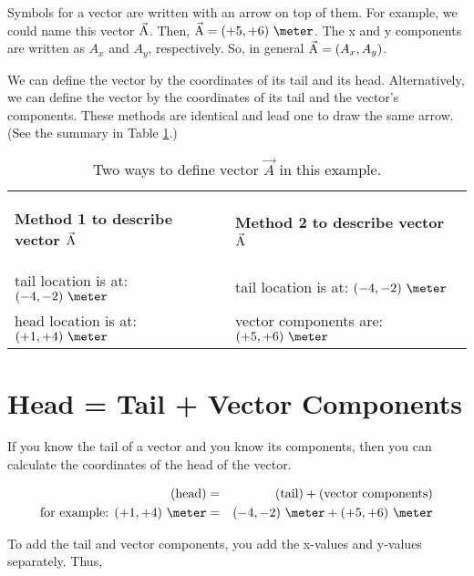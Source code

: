 Symbols for a vector are written with an arrow on top of them. For example, we could name this vector $\vec{\mathrm{A}}$. Then, $\vect{A}=(+5,+6)\ \meter$. The x and y components are written as $A_x$ and $A_y$, respectively. So, in general  $\vec{\mathrm{A}}=(A_x,A_y)$.

We can define the vector by the coordinates of its tail and its head. Alternatively, we can define the vector by the coordinates of its tail and the vector's components. These methods are identical and lead one to draw the same arrow. (See the summary in Table \ref{vectors/definition}.)

\begin{table}[htdp]
\caption{Two ways to define vector $\vec{A}$ in this example.}
\begin{center}
\begin{tabular}{|m{3in}|m{3in}|}

\hline
\hline
\begin{center}{\bf Method 1 to describe vector $\vec{\mathrm{A}}$ }\end{center}  & \begin{center}{\bf Method 2 to describe vector $\vec{\mathrm{A}}$ }\end{center} \\
tail location is at: $(-4,-2)\ \meter$ &  tail location is at: $(-4,-2)\ \meter$ \\
head location is at: $(+1,+4)\ \meter$ & vector components are: $(+5,+6)\ \meter$ \\
\hline
\hline
\end{tabular}
\end{center}
\label{vectors/definition}
\end{table}%


\section*{Head = Tail + Vector Components}

If you know the tail of a vector and you know its components, then you can calculate the coordinates of the head of the vector.

\begin{eqnarray*}
	\mbox{(head)}& = & \mbox{(tail)} + \mbox{(vector components)} \\
	\mbox{for example: } (+1,+4)\ \meter & = & (-4,-2) \ \meter + (+5,+6)\ \meter 
\end{eqnarray*}

To add the tail and vector components, you add the x-values and y-values separately. Thus,

